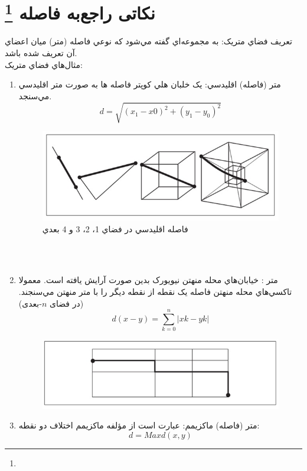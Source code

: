 \documentclass{book}
\begin{document}
\section*{نکاتی راجع‌به فاصله
\footnote{}}
تعريف فضاي متريک: به مجموعه‌اي گفته مي‌شود که نوعي فاصله (متر) ميان اعضاي آن تعريف شده باشد. \\
مثال‌هاي فضاي متريک:
\begin{enumerate}
	\item 
	متر (فاصله) اقليدسي: يک خلبان هلي کوپتر فاصله ها به صورت متر اقليدسي مي‌سنجد.   
	$$d=\sqrt{ (x_{1}-x{0})^{2} + (y_{1}-y_{0})^{2} }$$
	   \begin{figure}[h!]
		\begin{center}
			\includegraphics{3.jpg}
			\caption{فاصله اقليدسي در فضاي 1، 2، 3 و 4 بعدي}
		\end{center}
	   	\label{شکل 3}
	\end{figure}
\\
\\
\item 
متر 
: خيابان‌هاي محله منهتن نيويورک بدين صورت آرايش يافته است. معمولا تاکسي‌هاي محله منهتن فاصله يک نقطه از نقطه ديگر را با متر منهتن مي‌سنجند.                                                                       
(در فضای $n$-بعدی) 
$$d(x-y)=\sum_{k=0}^{n} |xk - yk|$$
	   \begin{figure}[h!]
	\begin{center}
		\includegraphics{4.jpg}
		\caption{}
	\end{center}
   	\label{شکل 4}
\end{figure}
\item 
	متر (فاصله) ماکزيمم: عبارت است از مؤلفه ماکزيمم اختلاف دو نقطه:   
	$$d= Max{d(x,y)}$$ 
\end{enumerate}
\end{document}
